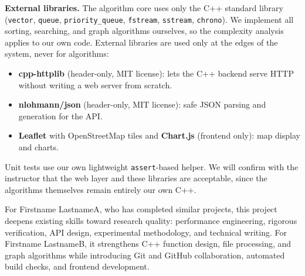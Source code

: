 \documentclass[11pt]{article}
\newcommand{\nameA}{Firstname LastnameA}
\newcommand{\nameB}{Firstname LastnameB}
\begin{document}
\noindent\textbf{External libraries.} The algorithm core uses only the C++
standard library (\texttt{vector}, \texttt{queue}, \texttt{priority\_queue},
\texttt{fstream}, \texttt{sstream}, \texttt{chrono}). We implement all
sorting, searching, and graph algorithms ourselves, so the complexity
analysis applies to our own code. External libraries are used only at the
edges of the system, never for algorithms:
\begin{itemize}
  \item \textbf{cpp-httplib} (header-only, MIT license): lets the C++ backend
        serve HTTP without writing a web server from scratch.
  \item \textbf{nlohmann/json} (header-only, MIT license): safe JSON parsing
        and generation for the API.
  \item \textbf{Leaflet} with OpenStreetMap tiles and \textbf{Chart.js}
        (frontend only): map display and charts.
\end{itemize}
Unit tests use our own lightweight \texttt{assert}-based helper. We will
confirm with the instructor that the web layer and these libraries are
acceptable, since the algorithms themselves remain entirely our own C++.

\medskip
\noindent For \nameA, who has completed similar projects, this project
deepens existing skills toward research quality: performance engineering,
rigorous verification, API design, experimental methodology, and
technical writing. For \nameB, it strengthens C++ function design, file
processing, and graph algorithms while introducing Git and GitHub
collaboration, automated build checks, and frontend development.
\end{document}
